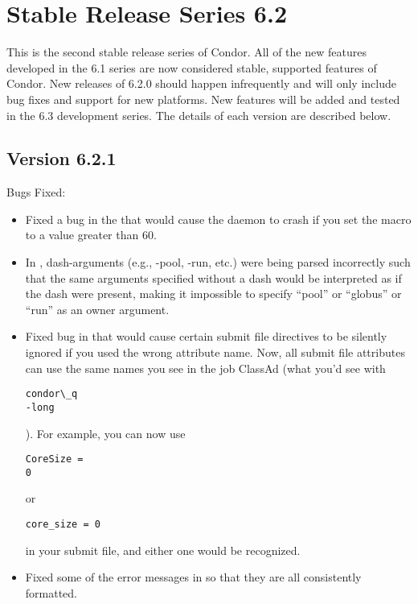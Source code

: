 \section{\label{sec:History-6-2}Stable Release Series 6.2}

This is the second stable release series of Condor.
All of the new features developed in the 6.1 series are now considered
stable, supported features of Condor.
New releases of 6.2.0 should happen infrequently and will only include
bug fixes and support for new platforms.
New features will be added and tested in the 6.3 development series. 
The details of each version are described below.

\subsection{\label{sec:New-6-2-1}Version 6.2.1}

\noindent Bugs Fixed:

\begin{itemize}

\item Fixed a bug in the  that would cause the daemon
to crash if you set the  macro to a value
greater than 60.

\item In , dash-arguments (e.g., -pool, -run, etc.) were being
parsed incorrectly such that the same arguments specified without a
dash would be interpreted as if the dash were present, making it
impossible to specify ``pool'' or ``globus'' or ``run'' as an owner
argument.

\item Fixed bug in  that would cause certain submit
file directives to be silently ignored if you used the wrong attribute
name.  
Now, all submit file attributes can use the same names you see in the
job ClassAd (what you'd see with \begin{verbatim}condor\_q
-long\end{verbatim}).
For example, you can now use \begin{verbatim}CoreSize =
0\end{verbatim} or \begin{verbatim}core_size = 0\end{verbatim} in your 
submit file, and either one would be recognized.

\item Fixed some of the error messages in  so that they
are all consistently formatted.

\end{itemize}

